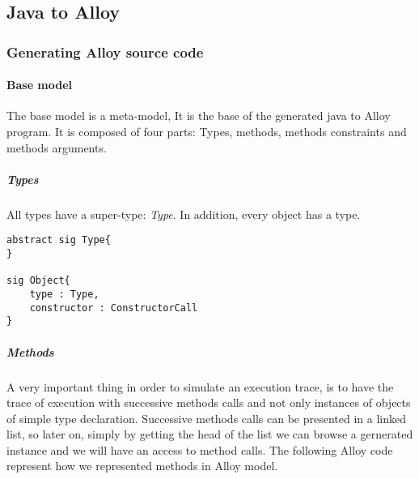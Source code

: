 \subsection{Java to Alloy}
\subsubsection{Generating Alloy source code}
\paragraph{Base model}
The base model is a meta-model, It is the base of the generated java to Alloy program.
It is composed of four parts: Types, methods, methods constraints and methods arguments.
\lstset{language=Alloy} 
\subparagraph{Types} All types have a super-type: \textit{Type}. In addition, every object has a type.
\begin{lstlisting}
abstract sig Type{
}

sig Object{
    type : Type,
    constructor : ConstructorCall
}
\end{lstlisting}
\subparagraph{Methods} A very important thing in order  to simulate an execution trace, is to have the trace of execution with successive methods calls and not only instances of objects of simple type declaration. Successive methods calls can be presented in a linked list, so later on, simply by getting the head of the list we can browse a gernerated instance and we will have an access to method calls. The following Alloy code represent how we represented methods in Alloy model.

